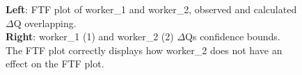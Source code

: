 \begin{figure}[H]
\begin{subfigure}{.5\textwidth}
                    \label{fig:ftf_art_dw}%
                \end{subfigure}%
                \caption{\textbf{Left}: FTF plot of worker\_1 and worker\_2, observed and calculated $\Delta$Q overlapping.\\
                \textbf{Right}: worker\_1 (1) and worker\_2 (2) $\Delta$Qs confidence bounds. \\
                The FTF plot correctly displays how worker\_2 does not have an effect on the FTF plot.}
                \label{fig:ftf_w1w2}%
            \end{figure}%

